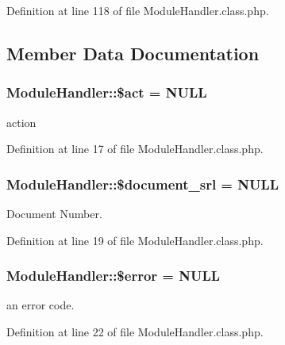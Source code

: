 Definition at line 118 of file Module\-Handler.\-class.\-php.



\subsection{Member Data Documentation}
\hypertarget{classModuleHandler_ae332c92a6ad1e9e823281d708088a0ff}{
\subsubsection[{\$act}]{\setlength{\rightskip}{0pt plus 5cm}Module\-Handler\-::\$act = N\-U\-L\-L}}\label{classModuleHandler_ae332c92a6ad1e9e823281d708088a0ff}


action 



Definition at line 17 of file Module\-Handler.\-class.\-php.

\hypertarget{classModuleHandler_acf9f6062042025aab6a7e10f6b261909}{
\subsubsection[{\$document\-\_\-srl}]{\setlength{\rightskip}{0pt plus 5cm}Module\-Handler\-::\$document\-\_\-srl = N\-U\-L\-L}}\label{classModuleHandler_acf9f6062042025aab6a7e10f6b261909}


Document Number. 



Definition at line 19 of file Module\-Handler.\-class.\-php.

\hypertarget{classModuleHandler_ad81b78f21e42724e73da6808c561159c}{
\subsubsection[{\$error}]{\setlength{\rightskip}{0pt plus 5cm}Module\-Handler\-::\$error = N\-U\-L\-L}}\label{classModuleHandler_ad81b78f21e42724e73da6808c561159c}


an error code. 



Definition at line 22 of file Module\-Handler.\-class.\-php.

